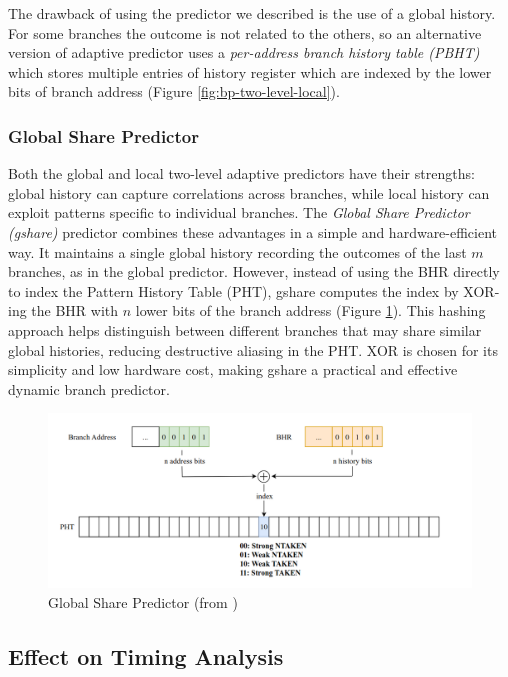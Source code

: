 The drawback of using the predictor we described is the use of a global history. For some branches the outcome is not related to the others, so an alternative version of adaptive predictor uses a \textit{per-address branch history table (PBHT)} which stores multiple entries of history register which are indexed by the lower bits of branch address (Figure \ref{fig:bp-two-level-local}).



\subsubsection{Global Share Predictor}

Both the global and local two-level adaptive predictors have their strengths: global history can capture correlations across branches, while local history can exploit patterns specific to individual branches. The \textit{Global Share Predictor (gshare)} predictor combines these advantages in a simple and hardware-efficient way. It maintains a single global history recording the outcomes of the last $m$ branches, as in the global predictor. However, instead of using the BHR directly to index the Pattern History Table (PHT), gshare computes the index by XOR-ing the BHR with $n$ lower bits of the branch address (Figure \ref{fig:bp-gshare}). This hashing approach helps distinguish between different branches that may share similar global histories, reducing destructive aliasing in the PHT. XOR is chosen for its simplicity and low hardware cost, making gshare a practical and effective dynamic branch predictor.

\begin{figure}
    \includegraphics[width=\textwidth]{figures/bp-gshare.png}
    \caption{Global Share Predictor (from \cite{mahling_reverse_2023})}
    \label{fig:bp-gshare}
\end{figure}

\subsection{Effect on Timing Analysis}

